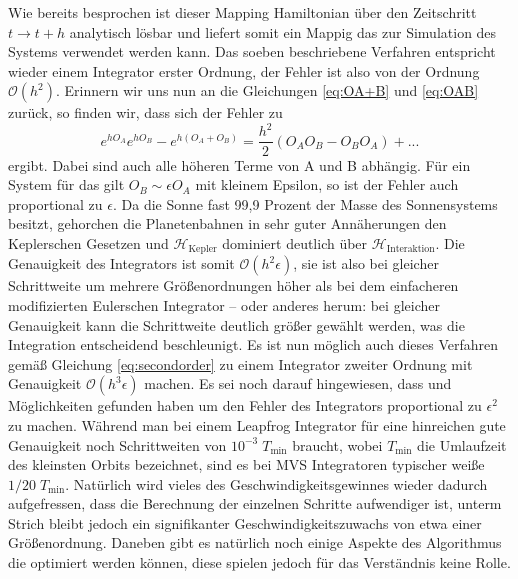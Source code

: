 \documentclass[12pt,a4paper,twoside]{article}
\renewcommand{\cite}{\citep}
\renewcommand{\H}{\mathcal H}
\begin{document}
Wie bereits besprochen ist dieser Mapping Hamiltonian über den Zeitschritt $t \to t+h$ analytisch lösbar und liefert somit ein Mappig das zur Simulation des Systems verwendet werden kann.
Das soeben beschriebene Verfahren entspricht wieder einem Integrator erster Ordnung, der Fehler ist also von der Ordnung $\mathcal{O}(h^2)$.
Erinnern wir uns nun an die Gleichungen \ref{eq:OA+B} und \ref{eq:OAB} zurück, so finden wir, dass sich der Fehler zu
\begin{equation}
e^{hO_A}e^{hO_B}-e^{h\left(O_A+O_B\right)} = \frac{h^2}{2} \left( O_AO_B-O_BO_A \right) + ...
\end{equation}
ergibt. Dabei sind auch alle höheren Terme von A und B abhängig\cite{Chambers1999}. Für ein System für das gilt $O_B\sim\epsilon O_A$ mit kleinem Epsilon, so ist der Fehler auch proportional zu $\epsilon$.
Da die Sonne fast 99,9 Prozent der Masse des Sonnensystems besitzt, %
gehorchen die Planetenbahnen in sehr guter Annäherungen den Keplerschen Gesetzen und $\H_{\mathrm{Kepler}}$ dominiert deutlich über $\H_{\mathrm{Interaktion}}$. Die Genauigkeit des Integrators ist somit $\mathcal{O}(h^2\epsilon)$, sie ist also bei gleicher Schrittweite um mehrere Größenordnungen höher als bei dem einfacheren modifizierten Eulerschen Integrator – oder anderes herum: bei gleicher Genauigkeit kann die Schrittweite deutlich größer gewählt werden, was die Integration entscheidend beschleunigt. %
Es ist nun möglich auch dieses Verfahren gemäß Gleichung \ref{eq:secondorder} zu einem Integrator zweiter Ordnung  mit Genauigkeit $\mathcal{O}(h^3\epsilon)$ machen. Es sei noch darauf hingewiesen, dass \cite{Saha1992} und \cite{Wisdom1996} Möglichkeiten 
gefunden haben um den Fehler des Integrators proportional zu $\epsilon^2$ zu machen. %
Während man bei einem Leapfrog Integrator für eine hinreichen gute Genauigkeit noch Schrittweiten von $10^{-3}\;T_{\mathrm{min}}$ braucht, wobei $T_{\mathrm{min}}$ die Umlaufzeit des kleinsten Orbits bezeichnet, sind es bei MVS Integratoren typischer weiße $1/20\;T_{\mathrm{min}}$\cite{Duncan1998}. Natürlich wird vieles des Geschwindigkeitsgewinnes wieder dadurch aufgefressen, dass die Berechnung der einzelnen Schritte aufwendiger ist, unterm Strich bleibt jedoch ein signifikanter Geschwindigkeitszuwachs von etwa einer Größenordnung\cite{Chambers1999}.
Daneben gibt es natürlich noch einige Aspekte des Algorithmus die optimiert werden können, diese spielen jedoch für das Verständnis keine Rolle. %

\end{document}
